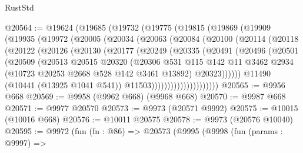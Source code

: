 \begin{lexlean}{RustStd}
\begin{coremodule}
@20564 := @19624
    (@19685
      (@19732
        (@19775
          (@19815
            (@19869
              (@19909
                (@19935
                  (@19972
                    (@20005
                      (@20034
                        (@20063
                          (@20084
                            (@20100
                              (@20114
                                (@20118
                                  (@20122
                                    (@20126
                                      (@20130
                                        (@20177
                                          (@20249
                                            (@20335
                                              (@20491
                                                (@20496
                                                  (@20501
                                                    (@20509
                                                      (@20513
                                                        @20515
                                                        @20320
                                                        (@20306
                                                          @531
                                                          @115
                                                          @142
                                                          @11
                                                          @3462
                                                          @2934
                                                          (@10723
                                                            @20253
                                                            @2668
                                                            @528
                                                            @142
                                                            @3461
                                                            @13892)
                                                          @20323))))))
                                              @11490
                                              (@10441 (@13925 @1041 @541))
                                              @11503)))))))))))))))))))))
@20565 := @9956 @668
@20569 := @9958 (@9962 @668) (@9968 @668)
@20570 := @9987 @668
@20571 := @9977 @20570
@20573 := @9973 (@20571 @9992)
@20575 := @10015 (@10016 @668)
@20576 := @10011 @20575
@20578 := @9973 (@20576 @10040)
@20595 := @9972
    (fun (fn : @86) =>
    @20573
      (@9995
        (@9998
          (fun (params : @9997) =>

\end{coremodule}
\end{lexlean}
